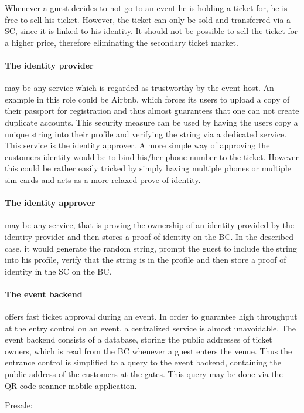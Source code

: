 Whenever a guest decides to not go to an event he is holding a ticket for, he is free to sell his ticket. However, the ticket can only be sold and transferred via a SC, since it is linked to his identity. It should not be possible to sell the ticket for a higher price, therefore eliminating the secondary ticket market.

\paragraph{The identity provider} may be any service which is regarded as trustworthy by the event host. An example in this role could be Airbnb, which forces its users to upload a copy of their passport for registration and thus almost guarantees that one can not create duplicate accounts. This security measure can be used by having the users copy a unique string into their profile and verifying the string via a dedicated service. This service is the identity approver. A more simple way of approving the customers identity would be to bind his/her phone number to the ticket. However this could be rather easily tricked by simply having multiple phones or multiple sim cards and acts as a more relaxed prove of identity.

\paragraph{The identity approver} may be any service, that is proving the ownership of an identity provided by the identity provider and then stores a proof of identity on the BC. In the described case, it would generate the random string, prompt the guest to include the string into his profile, verify that the string is in the profile and then store a proof of identity in the SC on the BC.

\paragraph{The event backend} offers fast ticket approval during an event. In order to guarantee high throughput at the entry control on an event, a centralized service is almost unavoidable. The event backend consists of a database, storing the public addresses of ticket owners, which is read from the BC whenever a guest enters the venue. Thus the entrance control is simplified to a query to the event backend, containing the public address of the customers at the gates. This query may be done via the QR-code scanner mobile application.

Presale:
